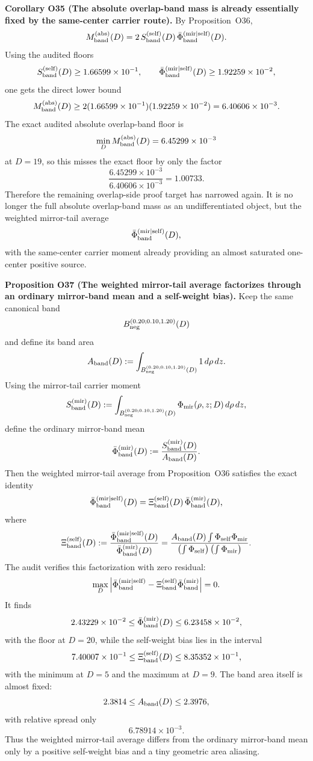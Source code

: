\documentclass[aps,prd,onecolumn,notitlepage,nofootinbib,superscriptaddress,11pt,floatfix]{revtex4-2}
\begin{document}
\medskip\noindent\textbf{Corollary O35 (The absolute overlap-band mass is already essentially fixed by the same-center carrier route).}
By Proposition~O36,
\[
M_{\rm band}^{\rm(abs)}(D)
=
2\,S_{\rm band}^{\rm(self)}(D)\,\bar\Phi_{\rm band}^{\rm(mir|self)}(D).
\]
Using the audited floors
\[
S_{\rm band}^{\rm(self)}(D)\ge 1.66599\times10^{-1},
\qquad
\bar\Phi_{\rm band}^{\rm(mir|self)}(D)\ge 1.92259\times10^{-2},
\]
one gets the direct lower bound
\[
M_{\rm band}^{\rm(abs)}(D)
\ge
2(1.66599\times10^{-1})(1.92259\times10^{-2})
=
6.40606\times10^{-3}.
\]
The exact audited absolute overlap-band floor is
\[
\min_D M_{\rm band}^{\rm(abs)}(D)
=
6.45299\times10^{-3}
\]
at \(D=19\), so this misses the exact floor by only the factor
\[
\frac{6.45299\times10^{-3}}{6.40606\times10^{-3}}
=
1.00733.
\]
Therefore the remaining overlap-side proof target has narrowed again. It is no longer the full absolute overlap-band mass as an undifferentiated object, but the weighted mirror-tail average
\[
\bar\Phi_{\rm band}^{\rm(mir|self)}(D),
\]
with the same-center carrier moment already providing an almost saturated one-center positive source.

\medskip\noindent\textbf{Proposition O37 (The weighted mirror-tail average factorizes through an ordinary mirror-band mean and a self-weight bias).}
Keep the same canonical band
\[
B_{\rm neg}^{(0.20;0.10,1.20)}(D)
\]
and define its band area
\[
A_{\rm band}(D)
:=
\int_{B_{\rm neg}^{(0.20;0.10,1.20)}(D)} 1\,d\rho\,dz.
\]
Using the mirror-tail carrier moment
\[
S_{\rm band}^{\rm(mir)}(D)
:=
\int_{B_{\rm neg}^{(0.20;0.10,1.20)}(D)} \Phi_{\rm mir}(\rho,z;D)\,d\rho\,dz,
\]
define the ordinary mirror-band mean
\[
\bar\Phi_{\rm band}^{\rm(mir)}(D)
:=
\frac{S_{\rm band}^{\rm(mir)}(D)}{A_{\rm band}(D)}.
\]
Then the weighted mirror-tail average from Proposition~O36 satisfies the exact identity
\[
\bar\Phi_{\rm band}^{\rm(mir|self)}(D)
=
\Xi_{\rm band}^{\rm(self)}(D)\,\bar\Phi_{\rm band}^{\rm(mir)}(D),
\]
where
\[
\Xi_{\rm band}^{\rm(self)}(D)
:=
\frac{\bar\Phi_{\rm band}^{\rm(mir|self)}(D)}{\bar\Phi_{\rm band}^{\rm(mir)}(D)}
=
\frac{A_{\rm band}(D)\int \Phi_{\rm self}\Phi_{\rm mir}}
{\left(\int \Phi_{\rm self}\right)\left(\int \Phi_{\rm mir}\right)}.
\]
The audit
verifies this factorization with zero residual:
\[
\max_D\left|\bar\Phi_{\rm band}^{\rm(mir|self)}-\Xi_{\rm band}^{\rm(self)}\bar\Phi_{\rm band}^{\rm(mir)}\right|
=
0.
\]
It finds
\[
2.43229\times10^{-2}
\le
\bar\Phi_{\rm band}^{\rm(mir)}(D)
\le
6.23458\times10^{-2},
\]
with the floor at \(D=20\), while the self-weight bias lies in the interval
\[
7.40007\times10^{-1}
\le
\Xi_{\rm band}^{\rm(self)}(D)
\le
8.35352\times10^{-1},
\]
with the minimum at \(D=5\) and the maximum at \(D=9\). The band area itself is almost fixed:
\[
2.3814
\le
A_{\rm band}(D)
\le
2.3976,
\]
with relative spread only
\[
6.78914\times10^{-3}.
\]
Thus the weighted mirror-tail average differs from the ordinary mirror-band mean only by a positive self-weight bias and a tiny geometric area aliasing.
\end{document}
